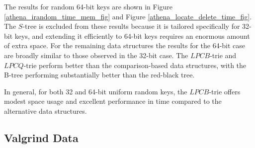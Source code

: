 \documentclass[]{acmtrans2m}
\begin{document}
The results for random 64-bit keys are shown in Figure \ref{athena_irandom_time_mem_fig} and Figure \ref{athena_locate_delete_time_fig}. The $S$-tree is excluded from
these results because it is tailored specifically for 32-bit keys, and
extending it efficiently to 64-bit keys requires an enormous amount of extra space.
For the remaining data structures the results for the 64-bit case are broadly similar to those observed in the 32-bit case. 
The $LPCB$-trie and $LPCQ$-trie perform better than the comparison-based data structures, with the B-tree performing substantially
better than the red-black tree.

In general, for both 32 and 64-bit uniform random keys, the $LPCB$-trie offers modest space usage and excellent performance
in time compared to the alternative data structures.


\subsection{Valgrind Data}
\label{valgrind_results_text}
\end{document}
